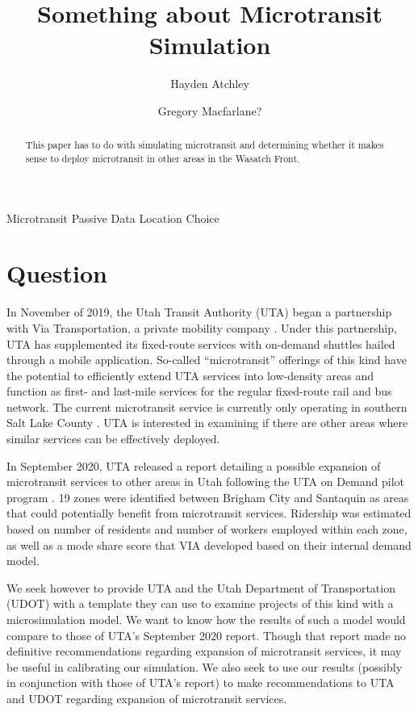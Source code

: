 \documentclass[3p, authoryear]{elsarticle} %
\begin{document}
\begin{frontmatter}

  \title{Something about Microtransit Simulation}
    \author[Brigham Young University]{Hayden Atchley}
    \author[Brigham Young University]{Gregory Macfarlane?}
      \address[Brigham Young University]{Civil and Construction Engineering Department, 430 Engineering Building, Provo, Utah 84602}
    
  \begin{abstract}
  This paper has to do with simulating microtransit and determining whether it makes sense to deploy microtransit in other areas in the Wasatch Front.
  \end{abstract}
   \begin{keyword} Microtransit Passive Data Location Choice\end{keyword}
 \end{frontmatter}

\hypertarget{question}{%
\section{Question}\label{question}}

In November of 2019, the Utah Transit Authority (UTA) began a partnership with Via Transportation, a private mobility company \citep{UTAreport}. Under this partnership, UTA has supplemented its fixed-route services with on-demand shuttles hailed through a mobile application. So-called ``microtransit'' offerings of this kind have the potential to efficiently extend UTA services into low-density areas and function as first- and last-mile services for the regular fixed-route rail and bus network. The current microtransit service is currently only operating in southern Salt Lake County \citep{UTAonDemand}. UTA is interested in examining if there are other areas where similar services can be effectively deployed.

In September 2020, UTA released a report detailing a possible expansion of microtransit services to other areas in Utah following the UTA on Demand pilot program \citep{UTAreport}. 19 zones were identified between Brigham City and Santaquin as areas that could potentially benefit from microtransit services. Ridership was estimated based on number of residents and number of workers employed within each zone, as well as a mode share score that VIA developed based on their internal demand model.

We seek however to provide UTA and the Utah Department of Transportation (UDOT) with a template they can use to examine projects of this kind with a microsimulation model. We want to know how the results of such a model would compare to those of UTA's September 2020 report. Though that report made no definitive recommendations regarding expansion of microtransit services, it may be useful in calibrating our simulation. We also seek to use our results (possibly in conjunction with those of UTA's report) to make recommendations to UTA and UDOT regarding expansion of microtransit services.
\end{document}
